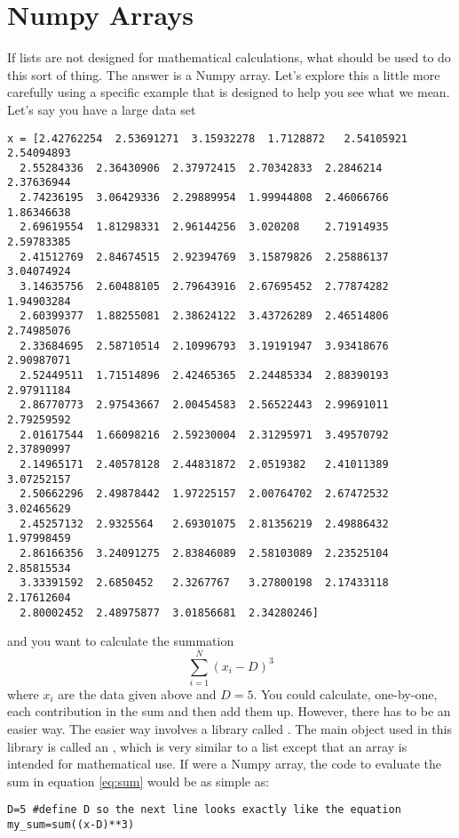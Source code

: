 \section{Numpy Arrays}
If lists are not designed for mathematical calculations, what should
be used to do this sort of thing.  The answer is a Numpy array. Let's
explore this a little more carefully using a specific example that is
designed to help you see what we mean.  Let's say
you have a large data set
\begin{Verbatim}
x = [2.42762254  2.53691271  3.15932278  1.7128872   2.54105921  2.54094893
  2.55284336  2.36430906  2.37972415  2.70342833  2.2846214   2.37636944
  2.74236195  3.06429336  2.29889954  1.99944808  2.46066766  1.86346638
  2.69619554  1.81298331  2.96144256  3.020208    2.71914935  2.59783385
  2.41512769  2.84674515  2.92394769  3.15879826  2.25886137  3.04074924
  3.14635756  2.60488105  2.79643916  2.67695452  2.77874282  1.94903284
  2.60399377  1.88255081  2.38624122  3.43726289  2.46514806  2.74985076
  2.33684695  2.58710514  2.10996793  3.19191947  3.93418676  2.90987071
  2.52449511  1.71514896  2.42465365  2.24485334  2.88390193  2.97911184
  2.86770773  2.97543667  2.00454583  2.56522443  2.99691011  2.79259592
  2.01617544  1.66098216  2.59230004  2.31295971  3.49570792  2.37890997
  2.14965171  2.40578128  2.44831872  2.0519382   2.41011389  3.07252157
  2.50662296  2.49878442  1.97225157  2.00764702  2.67472532  3.02465629
  2.45257132  2.9325564   2.69301075  2.81356219  2.49886432  1.97998459
  2.86166356  3.24091275  2.83846089  2.58103089  2.23525104  2.85815534
  3.33391592  2.6850452   2.3267767   3.27800198  2.17433118  2.17612604
  2.80002452  2.48975877  3.01856681  2.34280246]
\end{Verbatim}
and you want to calculate the summation
\begin{equation}\label{eq:sum}
\sum_{i=1}^N (x_i - D)^3
\end{equation}
where $x_i$ are the data given above and $D = 5$.  You could
calculate, one-by-one, each contribution in the sum and then add them
up.  However, there has to be an easier way.  The easier way involves
a library called  .  The main object used in this library
is called an , which is very similar to a list except that
an array is intended for mathematical use.  If  were a Numpy
array, the code to evaluate the sum in equation \ref{eq:sum} would be
as simple as:
\begin{Verbatim}
D=5 #define D so the next line looks exactly like the equation
my_sum=sum((x-D)**3)
\end{Verbatim}

